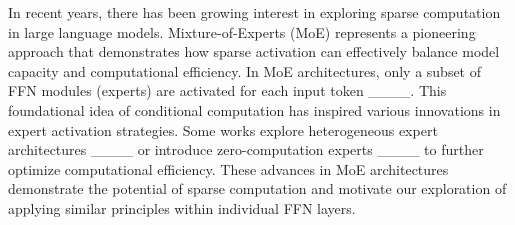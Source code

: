 In recent years, there has been growing interest in exploring sparse computation in large language models. Mixture-of-Experts (MoE) represents a pioneering approach that demonstrates how sparse activation can effectively balance model capacity and computational efficiency. In MoE architectures, only a subset of FFN modules (experts) are activated for each input token ____. This foundational idea of conditional computation has inspired various innovations in expert activation strategies. Some works explore heterogeneous expert architectures ____ or introduce zero-computation experts ____ to further optimize computational efficiency. These advances in MoE architectures demonstrate the potential of sparse computation and motivate our exploration of applying similar principles within individual FFN layers.